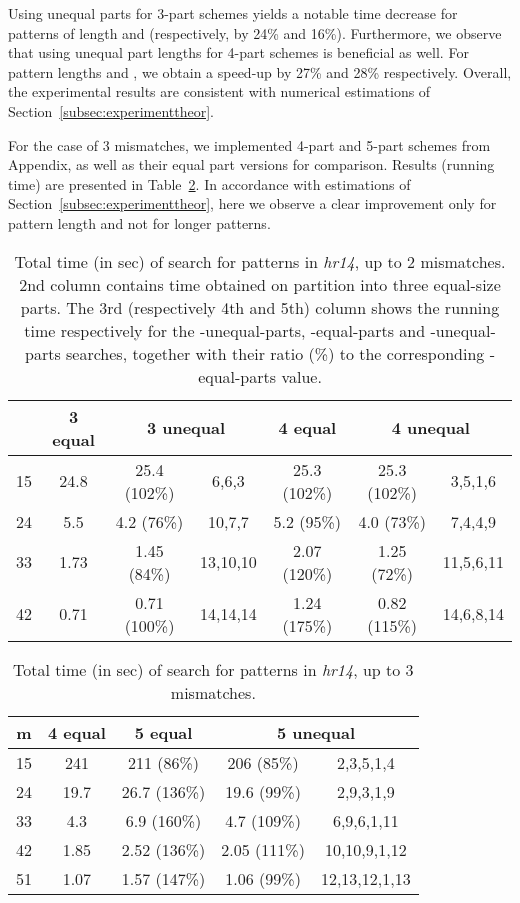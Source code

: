 \documentclass[12pt]{article}
\begin{document}
Using unequal parts for 3-part schemes yields a notable time decrease 
for patterns of length  and  (respectively, by 24\% and 16\%). 
Furthermore, we observe that
using unequal part lengths for 4-part schemes is beneficial as
well. For pattern lengths  and , we obtain a speed-up by
27\% and 28\% respectively.
Overall, the experimental results are consistent with numerical
estimations of Section~\ref{subsec:experimenttheor}. 

For the case of 3 mismatches, we implemented 4-part and 5-part schemes
from Appendix, as well as their equal part
versions for comparison. Results (running time) are presented in
Table~\ref{tab:times3}. In accordance with estimations of
Section~\ref{subsec:experimenttheor}, here we observe a clear
improvement only for pattern length  and not for longer
patterns.

\begin{table}[!tb]
\caption{Total time (in sec) of search for  patterns
in \emph{hr14}, up to 2 mismatches.
2nd column contains time obtained on partition into three equal-size parts. 
The 3rd (respectively 4th and 5th) column shows the running time
respectively for the -unequal-parts, 
-equal-parts and
-unequal-parts searches, together with their ratio (\%) to the
corresponding -equal-parts value.
\label{tab:times2}}
\centering
\begin{tabular}{|c|c|c|c|c|c|c|}
\hline
 & 3 equal & \multicolumn{2}{|c|}{3 unequal} & 4 equal & \multicolumn{2}{|c|}{4 unequal} \\
\hline
15 & 24.8 & 25.4 (102\%) & 6,6,3 & 25.3 (102\%) & 25.3 (102\%) & 3,5,1,6 \\
24 & 5.5 & 4.2 (76\%)  & 10,7,7 & 5.2 (95\%) & 4.0 (73\%) & 7,4,4,9 \\
33 & 1.73  & 1.45 (84\%)   & 13,10,10 & 2.07 (120\%)  & 1.25 (72\%) & 11,5,6,11 \\
42 & 0.71  & 0.71 (100\%)  & 14,14,14 & 1.24 (175\%)  & 0.82 (115\%) & 14,6,8,14 \\
\hline
\end{tabular}
\end{table}



\begin{table}[!tb]
\caption{Total time (in sec) of search for  patterns
  in \emph{hr14}, up to 3 mismatches.
\label{tab:times3}}
\centering
\begin{tabular}{|c|c|c|c|c|}
\hline
m & 4 equal & 5 equal & \multicolumn{2}{|c|}{5 unequal} \\
\hline
15 & 241 & 211 (86\%) & 206 (85\%) & 2,3,5,1,4 \\
24 & 19.7 & 26.7 (136\%) & 19.6 (99\%) & 2,9,3,1,9 \\
33 & 4.3 & 6.9 (160\%) & 4.7 (109\%) & 6,9,6,1,11 \\
42 & 1.85 & 2.52 (136\%) & 2.05 (111\%) & 10,10,9,1,12 \\
51 & 1.07 & 1.57 (147\%) & 1.06 (99\%) & 12,13,12,1,13 \\
\hline
\end{tabular}
\end{table}
\end{document}
